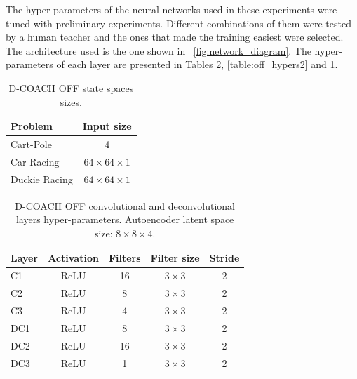 The hyper-parameters of the neural networks used in these experiments were tuned with preliminary experiments. Different combinations of them were tested by a human teacher and the ones that made the training easiest were selected. The architecture used is the one shown in \figurename~{\ref{fig:network_diagram}}. The hyper-parameters of each layer are presented in Tables \ref{table:off_hypers1}, \ref{table:off_hypers2} and \ref{table:off_hypers3}.

\begin{table}
\centering
\caption{D-COACH OFF state spaces sizes.}
\label{table:off_hypers3}
\begin{tabular}{lc}
\textbf{Problem}     & \textbf{Input size} \\ \hline \hline
Cart-Pole     & 4                   \\ \hline
Car Racing    & $64\times64\times1$  \\ \hline
Duckie Racing & $64\times64\times1$  \\ \hline
\end{tabular}
\end{table}

\begin{table}[H]
\parbox{\linewidth}{
\centering
\caption[D-COACH OFF convolutional and deconvolutional layers hyper-parameters.]{D-COACH OFF convolutional and deconvolutional layers hyper-parameters. Autoencoder latent space size: $8\times8\times4$.}
\label{table:off_hypers1}
\begin{tabular}{lcccc}
\textbf{Layer} & \multicolumn{1}{l}{\textbf{Activation}} & \multicolumn{1}{l}{\textbf{Filters}} & \multicolumn{1}{l}{\textbf{Filter size}} & \multicolumn{1}{l}{\textbf{Stride}} \\ \hline \hline
C1             & ReLU                                    & 16                                   & $3\times3$                                    & 2                                   \\ \hline
C2             & ReLU                                    & 8                                    & $3\times3$                                    & 2                                   \\ \hline
C3             & ReLU                                    & 4                                    & $3\times3$                                    & 2                                   \\ \hline
DC1            & ReLU                                    & 8                                    & $3\times3$                                    & 2                                   \\ \hline
DC2            & ReLU                                    & 16                                   & $3\times3$                                    & 2                                   \\ \hline
DC3            & ReLU                                    & 1                                    & $3\times3$                                    & 2                                   \\ \hline
\end{tabular}}
\end{table}

